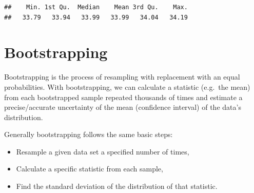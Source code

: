 \documentclass[
]{book}
\newenvironment{Shaded}{\begin{snugshade}}{\end{snugshade}}
\newcommand{\AttributeTok}[1]{\textcolor[rgb]{0.77,0.63,0.00}{#1}}
\newcommand{\CommentTok}[1]{\textcolor[rgb]{0.56,0.35,0.01}{\textit{#1}}}
\newcommand{\ConstantTok}[1]{\textcolor[rgb]{0.00,0.00,0.00}{#1}}
\newcommand{\ControlFlowTok}[1]{\textcolor[rgb]{0.13,0.29,0.53}{\textbf{#1}}}
\newcommand{\DecValTok}[1]{\textcolor[rgb]{0.00,0.00,0.81}{#1}}
\newcommand{\FunctionTok}[1]{\textcolor[rgb]{0.00,0.00,0.00}{#1}}
\newcommand{\NormalTok}[1]{#1}
\newcommand{\OtherTok}[1]{\textcolor[rgb]{0.56,0.35,0.01}{#1}}
\newcommand{\SpecialCharTok}[1]{\textcolor[rgb]{0.00,0.00,0.00}{#1}}
\newcommand{\StringTok}[1]{\textcolor[rgb]{0.31,0.60,0.02}{#1}}
\providecommand{\tightlist}{%
  \setlength{\itemsep}{0pt}\setlength{\parskip}{0pt}}
\begin{document}
\begin{Shaded}
\end{Shaded}

\begin{verbatim}
##    Min. 1st Qu.  Median    Mean 3rd Qu.    Max. 
##   33.79   33.94   33.99   33.99   34.04   34.19
\end{verbatim}

\hypertarget{bootstrapping}{%
\section{Bootstrapping}\label{bootstrapping}}

Bootstrapping is the process of resampling with replacement with an equal probabilities. With bootstrapping, we can calculate a statistic (e.g.~the mean) from each bootstrapped sample repeated thousands of times and estimate a precise/accurate uncertainty of the mean (confidence interval) of the data's distribution.

Generally bootstrapping follows the same basic steps:

\begin{itemize}
\tightlist
\item
  Resample a given data set a specified number of times,\\
\item
  Calculate a specific statistic from each sample,\\
\item
  Find the standard deviation of the distribution of that statistic.
\end{itemize}
\end{document}
